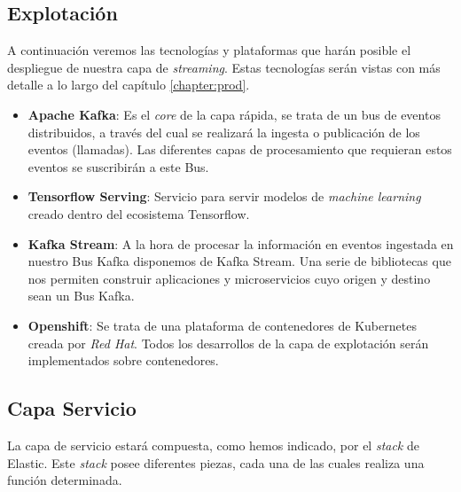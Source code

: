 \subsection{Explotación}

A continuación veremos las tecnologías y plataformas que harán posible el despliegue de nuestra capa de \textit{streaming}. Estas tecnologías serán vistas con más detalle a lo largo del capítulo \ref{chapter:prod}.

\begin{itemize}
	\item \textbf{Apache Kafka}: Es el \textit{core} de la capa rápida, se trata de un bus de eventos distribuidos, a través del cual se realizará la ingesta o publicación de los eventos (llamadas). Las diferentes capas de procesamiento que requieran estos eventos se suscribirán a este Bus.
	
	
	\item \textbf{Tensorflow Serving}: Servicio para servir modelos de \textit{machine learning} creado dentro del ecosistema Tensorflow.
	\item \textbf{Kafka Stream}: A la hora de procesar la información en eventos ingestada en nuestro Bus Kafka disponemos de Kafka Stream. Una serie de bibliotecas que nos permiten construir aplicaciones y microservicios cuyo origen y destino sean un Bus Kafka. 
	
	\item  \textbf{ Openshift}: Se trata de una plataforma de contenedores de Kubernetes creada por \textit{Red Hat}. Todos los desarrollos de la capa de explotación serán implementados sobre contenedores.

	
\end{itemize}

\subsection{Capa Servicio}

La capa de servicio estará compuesta, como hemos indicado, por el \textit{stack} de Elastic. Este \textit{stack} posee diferentes piezas, cada una de las cuales realiza una función determinada. 

